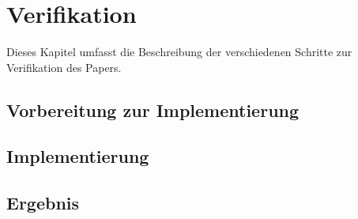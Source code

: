 \chapter{Verifikation}
\label{chap:verifikation}
Dieses Kapitel umfasst die Beschreibung der verschiedenen Schritte zur Verifikation des Papers. 

\section{Vorbereitung zur Implementierung}
\label{sec:vorbereitung}
\section{Implementierung}
\label{sec:implementierung}
\section{Ergebnis}
\label{sec:Ergebnis}

